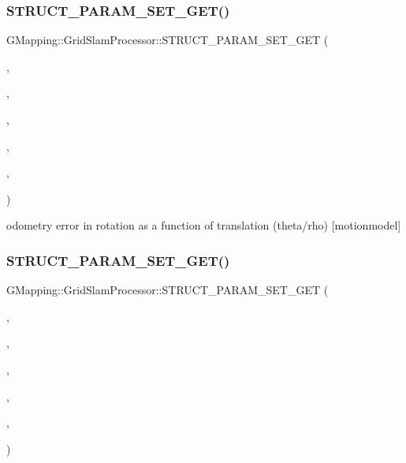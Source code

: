 \subsubsection{\texorpdfstring{S\+T\+R\+U\+C\+T\+\_\+\+P\+A\+R\+A\+M\+\_\+\+S\+E\+T\+\_\+\+G\+E\+T()}{STRUCT\_PARAM\_SET\_GET()}\hspace{0.1cm}{\footnotesize\ttfamily [3/4]}}
{\footnotesize\ttfamily G\+Mapping\+::\+Grid\+Slam\+Processor\+::\+S\+T\+R\+U\+C\+T\+\_\+\+P\+A\+R\+A\+M\+\_\+\+S\+E\+T\+\_\+\+G\+ET (\begin{DoxyParamCaption}\item[{\hyperlink{classGMapping_1_1GridSlamProcessor_ae1fa20e9679abdbc23784e2dc17194b5}{m\+\_\+motion\+Model}}]{,  }\item[{double}]{,  }\item[{str}]{,  }\item[{protected}]{,  }\item[{public}]{,  }\item[{public}]{ }\end{DoxyParamCaption})}

odometry error in rotation as a function of translation (theta/rho) \mbox{[}motionmodel\mbox{]} \mbox{\label{classGMapping_1_1GridSlamProcessor_a272f53828c2033879c364de540d1e0c0}} 
\subsubsection{\texorpdfstring{S\+T\+R\+U\+C\+T\+\_\+\+P\+A\+R\+A\+M\+\_\+\+S\+E\+T\+\_\+\+G\+E\+T()}{STRUCT\_PARAM\_SET\_GET()}\hspace{0.1cm}{\footnotesize\ttfamily [4/4]}}
{\footnotesize\ttfamily G\+Mapping\+::\+Grid\+Slam\+Processor\+::\+S\+T\+R\+U\+C\+T\+\_\+\+P\+A\+R\+A\+M\+\_\+\+S\+E\+T\+\_\+\+G\+ET (\begin{DoxyParamCaption}\item[{\hyperlink{classGMapping_1_1GridSlamProcessor_ae1fa20e9679abdbc23784e2dc17194b5}{m\+\_\+motion\+Model}}]{,  }\item[{double}]{,  }\item[{stt}]{,  }\item[{protected}]{,  }\item[{public}]{,  }\item[{public}]{ }\end{DoxyParamCaption})}

